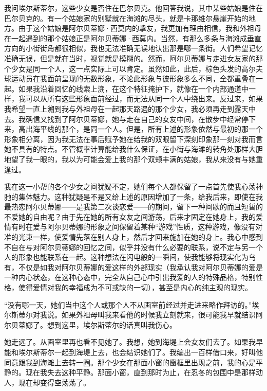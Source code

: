 \par 我问埃尔斯蒂尔，这些少女是否住在巴尔贝克。他回答我说，其中某些姑娘是住在巴尔贝克的。有一个姑娘家的别墅就在海滩的尽头，就是卡那维尔悬崖开始的地方。由于这个姑娘是阿尔贝蒂娜·西莫内的挚友，我更加有理由相信，我和外祖母在一起遇到的那个姑娘正是阿尔贝蒂娜·西莫内。当然，有那么多条与海滩成垂直方向的小街街角都很相似，我也无法准确无误地认出那是哪一条街。人们希望记忆准确无误，但是就在当时，视觉就是模糊的。然而，阿尔贝蒂娜与走进女友家的那个少女是同一个人，这一点实际上可以肯定。虽然如此，此后，棕色头发的高尔夫球运动员在我面前呈现的无数形象，不论此形象与彼形象多么不同，全都重叠在一起。如果我沿着回忆的线索上溯，在这个特征掩护下，就像在一个内部通道中一样，我可以从所有这些形象面前经过，而无法从同一个人中绕出来。反过来，如果我希望一直上溯到我与外祖母在一起那天路遇的那个少女，我必须再走到露天中去。我确信又找到了阿尔贝蒂娜，她与走在自己的女友中间，在散步中经常停下来，高出海平线的那个，是同一个人。但是，所有上述的形象依然与最初的那一个形象相分离，因为我无法在事后赋予她在给我的双眼留下深刻印象那一刻对我而言她不具有的特点。不管概率计算能给我什么保证，在小街与海滩的转角处那样大胆地望了我一眼的，我以为可能会爱上我的那个双颊丰满的姑娘，我从来没有与她重逢过。
\par 我在这一小帮的各个少女之间犹疑不定，她们每个人都保留了一点首先使我心荡神驰的集体魅力。这种犹疑是不是又给上述的原因增加了一条，给我后来，即使在我最热恋阿尔贝蒂娜——是我第二次谈恋爱——的期间，留下一种间歇的而且短暂的不爱她的自由呢？由于先在她的所有女友之间游荡，后来才固定在她身上，我的爱情有时在爱与阿尔贝蒂娜的形象之间保留着某种“游戏”性质，这种游戏，像没有对准的光束一样，使爱情先落在别人身上，然后才回来施加在她的身上。我心中感到不自在与对阿尔贝蒂娜的回忆之间，似乎并没有什么必要的联系，说不定与另一个人的形象也能联系在一起。这种想法在闪电般的一瞬间，使我能够将现实化为乌有，不仅是如我对阿尔贝蒂娜的爱这样的外部现实（我承认我对阿尔贝蒂娜的爱是一种内心状态，在这种心态中，完全从自己心中引出我爱的人的特殊品格，特别性格，使得爱情对我的幸福成为不可或缺的一切），甚至是内心的纯主观的现实。
\par “没有哪一天，她们当中这个人或那个人不从画室前经过并走进来略作拜访的。”埃尔斯蒂尔对我说。如果外祖母叫我来看他的时候我立刻就来，很可能我早就结识阿尔贝蒂娜了。想到这里，埃尔斯蒂尔的话真叫我伤心。
\par 她走远了。从画室里再也看不见她了。我想，她到海堤上会女友们去了。如果我早能和埃尔斯蒂尔一起到海堤上去，也会结识她们了。我编出一百样借口来，好叫他同意跟我到海滩上去转一圈。那个少女在那面小窗的窗框里出现之前，我的心是平静的。现在我失去这种平静。那面小窗，直到那时为止，在忍冬的包围中是那样动人，现在却变得空荡荡了。

